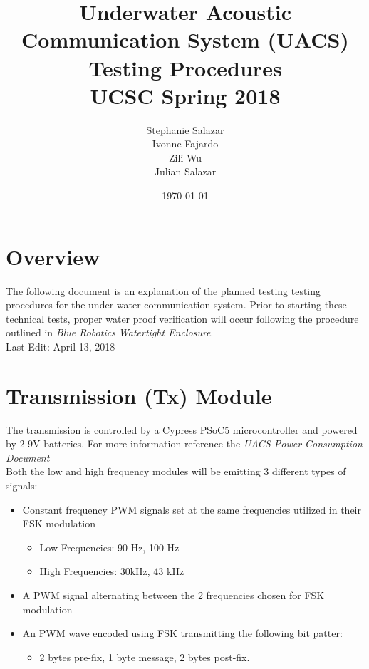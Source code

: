 \documentclass[11pt]{article} %
\begin{document}
\title{Underwater Acoustic Communication System (UACS) \\
		Testing Procedures\\
		UCSC Spring 2018\\
}

\author{Stephanie Salazar\\
        Ivonne Fajardo\\
        Zili Wu\\
        Julian Salazar}
\date{\today} 
\maketitle %

\newpage
\section{Overview}

The following document is an explanation of the planned testing testing procedures for the under water communication system. Prior to starting these technical tests, proper water proof verification will occur following the procedure outlined in \textit{Blue Robotics Watertight Enclosure}. 
\\
Last Edit: April 13, 2018 

\section{Transmission (Tx) Module}

The transmission is controlled by a Cypress PSoC5 microcontroller and powered by 2 9V batteries. For more information reference the \textit{UACS Power Consumption Document} \\

Both the low and high frequency modules will be emitting 3 different types of signals:
\begin{itemize}
\item Constant frequency PWM signals set at the same frequencies utilized in their FSK modulation
	\begin{itemize}
	\item Low Frequencies: 90 Hz, 100 Hz
    \item High Frequencies: 30kHz, 43 kHz 
	\end{itemize}
\item A PWM signal alternating between the 2 frequencies chosen for FSK modulation 
\item An PWM wave encoded using FSK transmitting the following bit patter: 
\begin{itemize}
\item  2 bytes pre-fix, 1 byte message, 2 bytes post-fix. 
\end{itemize}
\end{itemize}
\end{document}
